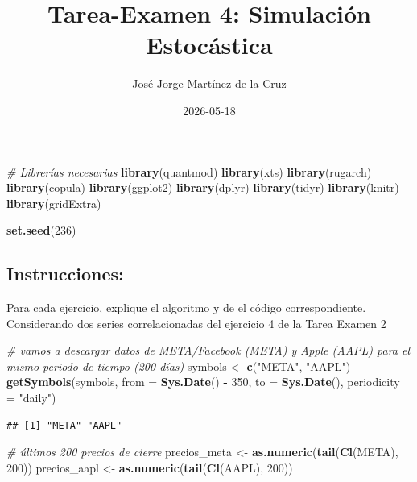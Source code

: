 \documentclass[
]{article}
\title{Tarea-Examen 4: Simulación Estocástica}
\author{José Jorge Martínez de la Cruz}
\date{2026-05-18}
\newenvironment{Shaded}{\begin{snugshade}}{\end{snugshade}}
\newcommand{\AttributeTok}[1]{\textcolor[rgb]{0.13,0.29,0.53}{#1}}
\newcommand{\CommentTok}[1]{\textcolor[rgb]{0.56,0.35,0.01}{\textit{#1}}}
\newcommand{\DecValTok}[1]{\textcolor[rgb]{0.00,0.00,0.81}{#1}}
\newcommand{\FunctionTok}[1]{\textcolor[rgb]{0.13,0.29,0.53}{\textbf{#1}}}
\newcommand{\NormalTok}[1]{#1}
\newcommand{\OtherTok}[1]{\textcolor[rgb]{0.56,0.35,0.01}{#1}}
\newcommand{\SpecialCharTok}[1]{\textcolor[rgb]{0.81,0.36,0.00}{\textbf{#1}}}
\newcommand{\StringTok}[1]{\textcolor[rgb]{0.31,0.60,0.02}{#1}}
\begin{document}
\maketitle

{
\setcounter{tocdepth}{3}
\tableofcontents
}
\begin{Shaded}
\begin{Highlighting}[]
\CommentTok{\# Librerías necesarias}
\FunctionTok{library}\NormalTok{(quantmod)}
\FunctionTok{library}\NormalTok{(xts)}
\FunctionTok{library}\NormalTok{(rugarch)}
\FunctionTok{library}\NormalTok{(copula)}
\FunctionTok{library}\NormalTok{(ggplot2)}
\FunctionTok{library}\NormalTok{(dplyr)}
\FunctionTok{library}\NormalTok{(tidyr)}
\FunctionTok{library}\NormalTok{(knitr)}
\FunctionTok{library}\NormalTok{(gridExtra)}

\FunctionTok{set.seed}\NormalTok{(}\DecValTok{236}\NormalTok{)}
\end{Highlighting}
\end{Shaded}

\subsection{Instrucciones:}\label{instrucciones}

Para cada ejercicio, explique el algoritmo y de el código
correspondiente. Considerando dos series correlacionadas del ejercicio 4
de la Tarea Examen 2

\begin{Shaded}
\begin{Highlighting}[]
\CommentTok{\# vamos a descargar datos de META/Facebook (META) y Apple (AAPL) para el mismo periodo de tiempo (200 días)}
\NormalTok{symbols }\OtherTok{\textless{}{-}} \FunctionTok{c}\NormalTok{(}\StringTok{"META"}\NormalTok{, }\StringTok{"AAPL"}\NormalTok{)}
\FunctionTok{getSymbols}\NormalTok{(symbols, }\AttributeTok{from =} \FunctionTok{Sys.Date}\NormalTok{() }\SpecialCharTok{{-}} \DecValTok{350}\NormalTok{, }\AttributeTok{to =} \FunctionTok{Sys.Date}\NormalTok{(), }\AttributeTok{periodicity =} \StringTok{"daily"}\NormalTok{)}
\end{Highlighting}
\end{Shaded}

\begin{verbatim}
## [1] "META" "AAPL"
\end{verbatim}

\begin{Shaded}
\begin{Highlighting}[]
\CommentTok{\# últimos 200 precios de cierre}
\NormalTok{precios\_meta }\OtherTok{\textless{}{-}} \FunctionTok{as.numeric}\NormalTok{(}\FunctionTok{tail}\NormalTok{(}\FunctionTok{Cl}\NormalTok{(META), }\DecValTok{200}\NormalTok{))}
\NormalTok{precios\_aapl }\OtherTok{\textless{}{-}} \FunctionTok{as.numeric}\NormalTok{(}\FunctionTok{tail}\NormalTok{(}\FunctionTok{Cl}\NormalTok{(AAPL), }\DecValTok{200}\NormalTok{))}
\end{Highlighting}
\end{Shaded}
\end{document}

